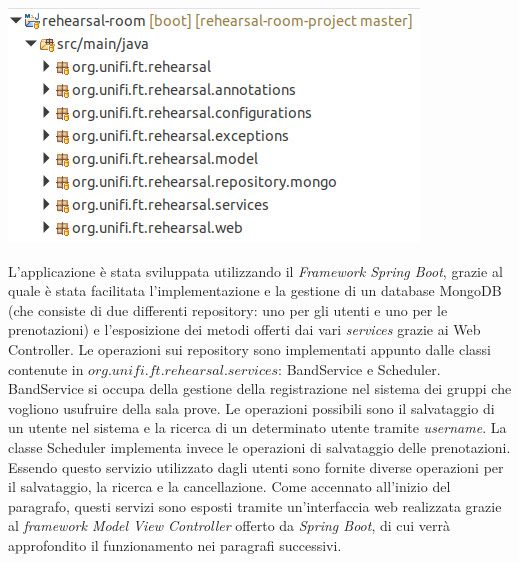 \begin{minipage}{\linewidth}
	\includegraphics[width=\textwidth]{img/packages.png}
\end{minipage}

L'applicazione è stata sviluppata utilizzando il \textsl{Framework Spring Boot}, grazie al quale è stata facilitata l'implementazione e la gestione di un database MongoDB (che consiste di due differenti repository: uno per gli utenti e uno per le prenotazioni) e l'esposizione dei metodi offerti dai vari \textsl{services} grazie ai Web Controller.\newline\newline
Le operazioni sui repository sono implementati appunto dalle classi contenute in $org.unifi.ft.rehearsal.services$: BandService e Scheduler.\newline
BandService si occupa della gestione della registrazione nel sistema dei gruppi che vogliono usufruire della sala prove. Le operazioni possibili sono il salvataggio di un utente nel sistema e la ricerca di un determinato utente tramite \textsl{username}.\newline
La classe Scheduler implementa invece le operazioni di salvataggio delle prenotazioni. Essendo questo servizio utilizzato dagli utenti sono fornite diverse operazioni per il salvataggio, la ricerca e la cancellazione.\newline\newline
Come accennato all'inizio del paragrafo, questi servizi sono esposti tramite un'interfaccia web realizzata grazie al \textsl{framework Model View Controller} offerto da \textsl{Spring Boot}, di cui verrà approfondito il funzionamento nei paragrafi successivi.